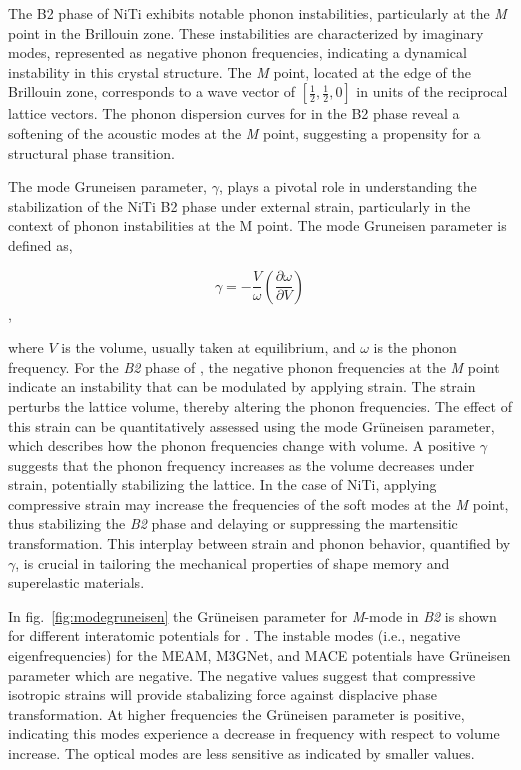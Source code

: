 \documentclass[preprint,colorlinks=true,linkcolor=black,citecolor=black]{elsarticle}
\begin{document}
The B2 phase of NiTi exhibits notable phonon instabilities,
particularly at the \textit{M} point in the Brillouin zone. These
instabilities are characterized by imaginary modes, represented as
negative phonon frequencies, indicating a dynamical instability in
this crystal structure. The \textit{M} point, located at the edge of
the Brillouin zone, corresponds to a wave vector of
$\left[\frac{1}{2}, \frac{1}{2}, 0\right]$ in units of the reciprocal
lattice vectors. The phonon dispersion curves for  in the B2
phase reveal a softening of the acoustic modes at the \textit{M}
point, suggesting a propensity for a structural phase transition. \par

The mode Gruneisen parameter, $\gamma$, plays a pivotal role in
understanding the stabilization of the NiTi B2 phase under external
strain, particularly in the context of phonon instabilities at the M
point. The mode Gruneisen parameter is defined as,

\begin{equation}
  \label{eq:modegruneisen}
  \gamma = -\frac{V}{\omega}\left(\frac{\partial \omega}{\partial V}\right)
\end{equation},

where $V$ is the volume, usually taken at equilibrium, and $\omega$ is
the phonon frequency. For the \textit{B2} phase of , the
negative phonon frequencies at the \textit{M} point indicate an
instability that can be modulated by applying strain. The strain
perturbs the lattice volume, thereby altering the phonon
frequencies. The effect of this strain can be quantitatively assessed
using the mode Gr\"{u}neisen parameter, which describes how the phonon
frequencies change with volume. A positive $\gamma$ suggests that the
phonon frequency increases as the volume decreases under strain,
potentially stabilizing the lattice. In the case of NiTi, applying
compressive strain may increase the frequencies of the soft modes at
the \textit{M} point, thus stabilizing the \textit{B2} phase and
delaying or suppressing the martensitic transformation. This interplay
between strain and phonon behavior, quantified by $\gamma$, is crucial
in tailoring the mechanical properties of shape memory and
superelastic materials.


In fig.~\ref{fig:modegruneisen} the Gr\"{u}neisen parameter for
\textit{M}-mode in \textit{B2} is shown for different interatomic
potentials for . The instable modes (i.e., negative
eigenfrequencies) for the MEAM, M3GNet, and MACE potentials have
Gr\"{u}neisen parameter which are negative. The negative values
suggest that compressive isotropic strains will provide stabalizing
force against displacive phase transformation. At higher frequencies
the Gr\"{u}neisen parameter is positive, indicating this modes
experience a decrease in frequency with respect to volume
increase. The optical modes are less sensitive as indicated by smaller
values. \par
\end{document}
